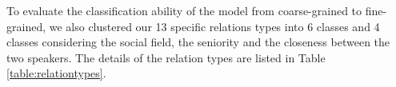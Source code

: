 %

To evaluate the classification ability of the model from coarse-grained to fine-grained, we also clustered our 13 specific 
relations types into 6 classes and 4 classes considering the social field, the seniority 
and the closeness between the two speakers. The details of the relation types are listed
in Table \ref{table:relationtypes}.
